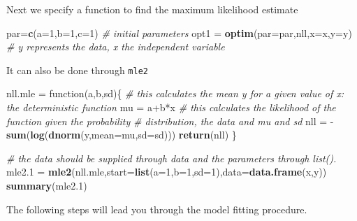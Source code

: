 \documentclass[]{article}
\newenvironment{Shaded}{\begin{snugshade}}{\end{snugshade}}
\newcommand{\KeywordTok}[1]{\textcolor[rgb]{0.13,0.29,0.53}{\textbf{{#1}}}}
\newcommand{\DataTypeTok}[1]{\textcolor[rgb]{0.13,0.29,0.53}{{#1}}}
\newcommand{\DecValTok}[1]{\textcolor[rgb]{0.00,0.00,0.81}{{#1}}}
\newcommand{\FloatTok}[1]{\textcolor[rgb]{0.00,0.00,0.81}{{#1}}}
\newcommand{\StringTok}[1]{\textcolor[rgb]{0.31,0.60,0.02}{{#1}}}
\newcommand{\CommentTok}[1]{\textcolor[rgb]{0.56,0.35,0.01}{\textit{{#1}}}}
\newcommand{\NormalTok}[1]{{#1}}
\begin{document}
Next we specify a function to find the maximum likelihood estimate

\begin{Shaded}
\begin{Highlighting}[]
\NormalTok{par=}\KeywordTok{c}\NormalTok{(}\DataTypeTok{a=}\DecValTok{1}\NormalTok{,}\DataTypeTok{b=}\DecValTok{1}\NormalTok{,}\DataTypeTok{c=}\DecValTok{1}\NormalTok{) }\CommentTok{# initial parameters}
\NormalTok{opt1 =}\StringTok{ }\KeywordTok{optim}\NormalTok{(}\DataTypeTok{par=}\NormalTok{par,nll,}\DataTypeTok{x=}\NormalTok{x,}\DataTypeTok{y=}\NormalTok{y) }\CommentTok{# y represents the data, x the independent variable}
\end{Highlighting}
\end{Shaded}

It can also be done through \texttt{mle2}

\begin{Shaded}
\begin{Highlighting}[]
\NormalTok{nll.mle =}\StringTok{ }\NormalTok{function(a,b,sd)\{}
  \CommentTok{# this calculates the mean y for a given value of x: the deterministic function}
  \NormalTok{mu =}\StringTok{ }\NormalTok{a+b*x }
  \CommentTok{# this calculates the likelihood of the function given the probability }
  \CommentTok{# distribution, the data and mu and sd}
  \NormalTok{nll =}\StringTok{ }\NormalTok{-}\KeywordTok{sum}\NormalTok{(}\KeywordTok{log}\NormalTok{(}\KeywordTok{dnorm}\NormalTok{(y,}\DataTypeTok{mean=}\NormalTok{mu,}\DataTypeTok{sd=}\NormalTok{sd))) }
  \KeywordTok{return}\NormalTok{(nll)}
\NormalTok{\}}
\end{Highlighting}
\end{Shaded}

\begin{Shaded}
\begin{Highlighting}[]
\CommentTok{# the data should be supplied through data and the parameters through list().}
\NormalTok{mle2}\FloatTok{.1} \NormalTok{=}\StringTok{ }\KeywordTok{mle2}\NormalTok{(nll.mle,}\DataTypeTok{start=}\KeywordTok{list}\NormalTok{(}\DataTypeTok{a=}\DecValTok{1}\NormalTok{,}\DataTypeTok{b=}\DecValTok{1}\NormalTok{,}\DataTypeTok{sd=}\DecValTok{1}\NormalTok{),}\DataTypeTok{data=}\KeywordTok{data.frame}\NormalTok{(x,y)) }
\KeywordTok{summary}\NormalTok{(mle2}\FloatTok{.1}\NormalTok{)}
\end{Highlighting}
\end{Shaded}

The following steps will lead you through the model fitting procedure.
\end{document}
